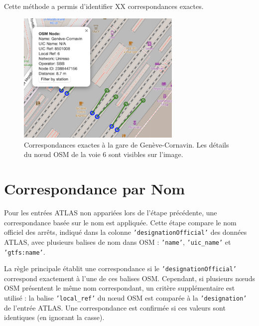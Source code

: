 Cette méthode a permis d'identifier XX correspondances exactes.
\begin{figure}[h] 
    \centering
    \includegraphics[width=0.7\textwidth]{../figures/correspondances/exact_Cornavin.png}
    \caption[Correspondances exactes à Genève-Cornavin]{Correspondances exactes à la gare de Genève-Cornavin. Les détails du nœud OSM de la voie 6 sont visibles sur l'image.}
    \label{fig:exact_cornavin}
\end{figure}

\section{Correspondance par Nom}

Pour les entrées ATLAS non appariées lors de l’étape précédente, une correspondance basée sur le nom est appliquée. Cette étape compare le nom officiel des arrêts, indiqué dans la colonne \texttt{'designationOfficial'} des données ATLAS, avec plusieurs balises de nom dans OSM : \texttt{'name'}, \texttt{'uic\_name'} et \texttt{'gtfs:name'}.

La règle principale établit une correspondance si le \texttt{'designationOfficial'} correspond exactement à l’une de ces balises OSM. Cependant, si plusieurs nœuds OSM présentent le même nom correspondant, un critère supplémentaire est utilisé : la balise \texttt{'local\_ref'} du nœud OSM est comparée à la \texttt{'designation'} de l’entrée ATLAS. Une correspondance est confirmée si ces valeurs sont identiques (en ignorant la casse).

